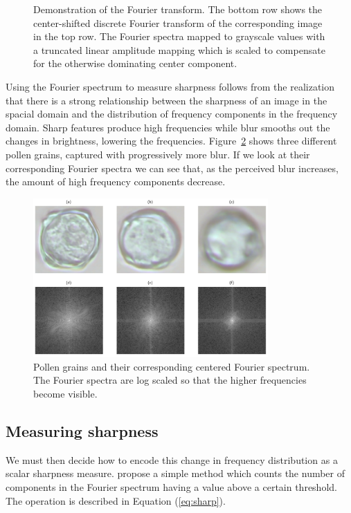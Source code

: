 \begin{figure}[htbp]
\begin{subfigure}[t]{0.2\textwidth}
  \end{subfigure}
  \caption[Demonstration of the Fourier transform]{
    Demonstration of the Fourier transform. The bottom row shows the center-shifted discrete Fourier transform of the corresponding image in the top row. The Fourier spectra mapped to grayscale values with a truncated linear amplitude mapping which is scaled to compensate for the otherwise dominating center component.}\label{fig:fourier-demo}
\end{figure}

Using the Fourier spectrum to measure sharpness follows from the realization that there is a strong relationship between the sharpness of an image in the spacial domain and the distribution of frequency components in the frequency domain.
Sharp features produce high frequencies while blur smooths out the changes in brightness, lowering the frequencies.
Figure~\ref{fig:fourier} shows three different pollen grains, captured with progressively more blur.
If we look at their corresponding Fourier spectra we can see that, as the perceived blur increases, the amount of high frequency components decrease.


\begin{figure}[htbp]
  \centering
  \includegraphics[width=0.8\textwidth]{figs/fourier.png}
  \caption[Fourier spectrum]{Pollen grains and their corresponding centered Fourier spectrum. The Fourier spectra are log scaled so that the higher frequencies become visible.}\label{fig:fourier}
\end{figure}

\subsection{Measuring sharpness}
We must then decide how to encode this change in frequency distribution as a scalar sharpness measure.
\citeauthor{de2013image} propose a simple method which counts the number of components in the Fourier spectrum having a value above a certain threshold.
The operation is described in Equation (\ref{eq:sharp}).


